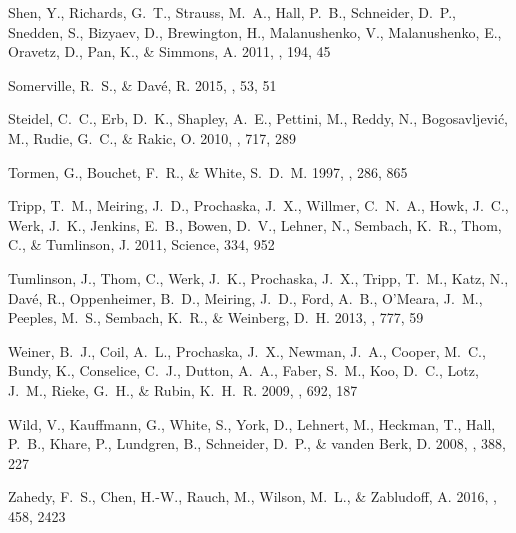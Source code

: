 \documentclass[iop]{emulateapj}
\begin{document}
\begin{thebibliography}{54}
{Shen}, Y., {Richards}, G.~T., {Strauss}, M.~A., {Hall}, P.~B., {Schneider},
  D.~P., {Snedden}, S., {Bizyaev}, D., {Brewington}, H., {Malanushenko}, V.,
  {Malanushenko}, E., {Oravetz}, D., {Pan}, K., \& {Simmons}, A. 2011, \apjs,
  194, 45

{Somerville}, R.~S., \& {Dav{\'e}}, R. 2015, \araa, 53, 51

{Steidel}, C.~C., {Erb}, D.~K., {Shapley}, A.~E., {Pettini}, M., {Reddy}, N.,
  {Bogosavljevi{\'c}}, M., {Rudie}, G.~C., \& {Rakic}, O. 2010, \apj, 717, 289

{Tormen}, G., {Bouchet}, F.~R., \& {White}, S.~D.~M. 1997, \mnras, 286, 865

{Tripp}, T.~M., {Meiring}, J.~D., {Prochaska}, J.~X., {Willmer}, C.~N.~A.,
  {Howk}, J.~C., {Werk}, J.~K., {Jenkins}, E.~B., {Bowen}, D.~V., {Lehner}, N.,
  {Sembach}, K.~R., {Thom}, C., \& {Tumlinson}, J. 2011, Science, 334, 952

{Tumlinson}, J., {Thom}, C., {Werk}, J.~K., {Prochaska}, J.~X., {Tripp}, T.~M.,
  {Katz}, N., {Dav{\'e}}, R., {Oppenheimer}, B.~D., {Meiring}, J.~D., {Ford},
  A.~B., {O'Meara}, J.~M., {Peeples}, M.~S., {Sembach}, K.~R., \& {Weinberg},
  D.~H. 2013, \apj, 777, 59

{Weiner}, B.~J., {Coil}, A.~L., {Prochaska}, J.~X., {Newman}, J.~A., {Cooper},
  M.~C., {Bundy}, K., {Conselice}, C.~J., {Dutton}, A.~A., {Faber}, S.~M.,
  {Koo}, D.~C., {Lotz}, J.~M., {Rieke}, G.~H., \& {Rubin}, K.~H.~R. 2009, \apj,
  692, 187

{Wild}, V., {Kauffmann}, G., {White}, S., {York}, D., {Lehnert}, M., {Heckman},
  T., {Hall}, P.~B., {Khare}, P., {Lundgren}, B., {Schneider}, D.~P., \&
  {vanden Berk}, D. 2008, \mnras, 388, 227

{Zahedy}, F.~S., {Chen}, H.-W., {Rauch}, M., {Wilson}, M.~L., \& {Zabludoff},
  A. 2016, \mnras, 458, 2423

\end{thebibliography}
\end{document}
